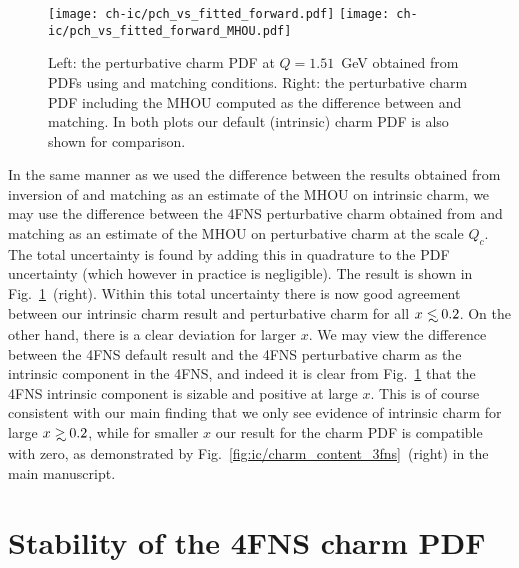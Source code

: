 \begin{figure}[h]
  \begin{center}
    \texttt{[image: ch-ic/pch\_vs\_fitted\_forward.pdf]}
    \texttt{[image: ch-ic/pch\_vs\_fitted\_forward\_MHOU.pdf]}
    \caption{\small Left: the perturbative charm PDF at $Q=1.51$~GeV
  obtained from \nnlo PDFs using \nnlo and \nnnlo matching
    conditions.
      Right: the \nnlo perturbative charm PDF including the MHOU
    computed as the difference between \nnlo and \nnnlo matching.
In both plots our default (intrinsic) charm PDF is also shown for comparison.  
  \label{fig:ic/charm_fitted_vs_perturbative_mhous} }
\end{center}
\end{figure}

In the same manner as we used the difference between the results obtained from
inversion of \nnlo and \nnnlo  matching as an estimate of the MHOU on
intrinsic charm, we may use the difference between the 4FNS
 perturbative charm obtained from \nnlo and \nnnlo matching as an
 estimate of the MHOU on perturbative charm at the scale $Q_c$.
 The total uncertainty is found by adding
 this in quadrature to the PDF uncertainty (which however in practice
 is negligible).
%
The result is shown in 
Fig.~\ref{fig:ic/charm_fitted_vs_perturbative_mhous}~(right).
Within this total uncertainty there is now good agreement between our
intrinsic charm result and perturbative charm for all
$x\lsim 0.2$. On the other hand, there is a clear deviation for larger
$x$. We may view the difference between the 4FNS default result
and the 4FNS perturbative  charm as the intrinsic component in the
4FNS, and indeed it is clear from
Fig.~\ref{fig:ic/charm_fitted_vs_perturbative_mhous} that the 4FNS
intrinsic component is sizable and positive at large $x$.
%
This is of course consistent with our main finding that we
only see evidence of intrinsic charm for large $x\gsim 0.2$, while for
smaller $x$ our result for the charm PDF is compatible with zero, as demonstrated by
Fig.~\ref{fig:ic/charm_content_3fns}~(right) in the main manuscript.


\section{Stability of the 4FNS charm PDF}
\label{app:ic/charm_stability_4fns}

